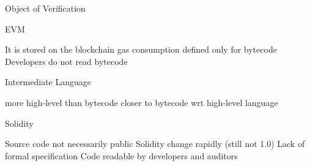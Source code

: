 \begin{frame}{Object of Verification}

\begin{block}{EVM}
\begin{itemize}
\pro It is stored on the blockchain
\pro gas consumption defined only for bytecode
\con Developers do not read bytecode
\end{itemize}
\end{block}

\begin{block}{Intermediate Language}
\begin{itemize}
\pro more high-level than bytecode
\con closer to bytecode wrt high-level language
\end{itemize}
\end{block}

\begin{block}{Solidity}
\begin{itemize}
\con Source code not necessarily public
\con Solidity change rapidly (still not 1.0)
\con Lack of formal specification
\pro Code readable by developers and auditors
\end{itemize}
\end{block}

\end{frame}

